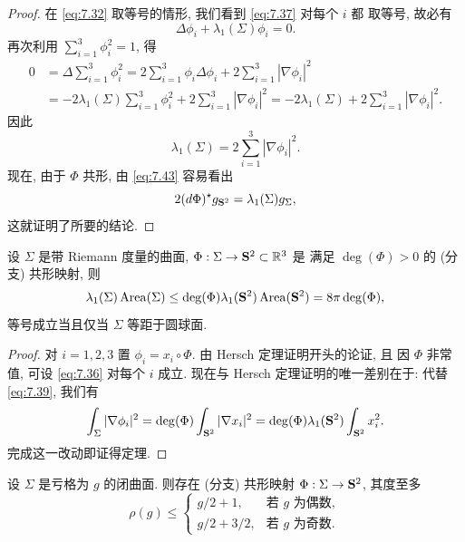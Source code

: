 \begin{proof}
在 \eqref{eq:7.32} 取等号的情形, 我们看到 \eqref{eq:7.37} 对每个 $i$ 都
取等号, 故必有
\begin{equation}
\Delta\phi_i+\lambda_1(\Sigma)\phi_i=0.
\label{eq:7.41}
\end{equation}
再次利用 $\sum_{i=1}^3\phi_i^2=1$, 得
\begin{equation}
\begin{aligned}
0&=\Delta\sum_{i=1}^3\phi_i^2
=2\sum_{i=1}^3\phi_i\Delta\phi_i+2\sum_{i=1}^3|\nabla\phi_i|^2\\
&=-2\lambda_1(\Sigma)\sum_{i=1}^3\phi_i^2+2\sum_{i=1}^3|\nabla\phi_i|^2
=-2\lambda_1(\Sigma)+2\sum_{i=1}^3|\nabla\phi_i|^2.
\end{aligned}
\label{eq:7.42}
\end{equation}
因此
\begin{equation}
\lambda_1(\Sigma)=2\sum_{i=1}^3|\nabla\phi_i|^2.
\label{eq:7.43}
\end{equation}
现在, 由于 $\Phi$ 共形, 由 \eqref{eq:7.43} 容易看出
\begin{equation}
2(d\Phi)^{\star}g_{\mathbf{S}^2}=\lambda_1(\Sigma)g_{\Sigma},
\label{eq:7.44}
\end{equation}
这就证明了所要的结论.
\end{proof}

\begin{theorem}
\label{thm:7.7}
设 $\Sigma$ 是带 Riemann 度量的曲面, $\Phi:\Sigma\to\mathbf{S}^2\subset\mathbb{R}^3$ 是
满足 $\deg(\Phi)>0$ 的 (分支) 共形映射, 则
\begin{equation}
\lambda_1(\Sigma)\operatorname{Area}(\Sigma)
\leq\deg(\Phi)\lambda_1(\mathbf{S}^2)\operatorname{Area}(\mathbf{S}^2)
=8\pi\deg(\Phi),
\label{eq:7.45}
\end{equation}
等号成立当且仅当 $\Sigma$ 等距于圆球面.
\end{theorem}

\begin{proof}
对 $i=1,2,3$ 置 $\phi_i=x_i\circ\Phi$. 由 Hersch 定理证明开头的论证, 且
因 $\Phi$ 非常值, 可设 \eqref{eq:7.36} 对每个 $i$ 成立. 现在与 Hersch
定理证明的唯一差别在于: 代替 \eqref{eq:7.39}, 我们有
\begin{equation}
\int_{\Sigma}|\nabla\phi_i|^2
=\deg(\Phi)\int_{\mathbf{S}^2}|\nabla x_i|^2
=\deg(\Phi)\lambda_1(\mathbf{S}^2)\int_{\mathbf{S}^2}x_i^2.
\label{eq:7.46}
\end{equation}
完成这一改动即证得定理.
\end{proof}

\begin{lemma}[参看 \cite{FK} 第 124 页]
\label{lem:7.8}
设 $\Sigma$ 是亏格为 $g$ 的闭曲面. 则存在 (分支) 共形映射
$\Phi:\Sigma\to\mathbf{S}^2$, 其度至多
\begin{equation}
\rho(g)\leq
\begin{cases}
g/2+1, & \text{若 } g \text{ 为偶数},\\
g/2+3/2, & \text{若 } g \text{ 为奇数}.
\end{cases}
\label{eq:7.47}
\end{equation}
\end{lemma}

